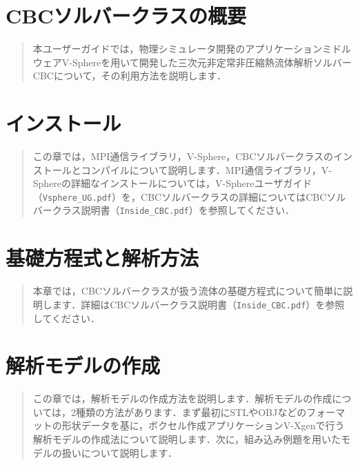 \documentclass[a4paper,10pt,oneside,fleqn]{jsbook}
\begin{document}
\chapter{CBCソルバークラスの概要}
\label{chpt:intro}
{\begin{abstract}
本ユーザーガイドでは，物理シミュレータ開発のアプリケーションミドルウェアV-Sphereを用いて開発した三次元非定常非圧縮熱流体解析ソルバーCBCについて，その利用方法を説明します．
\end{abstract}
%




\chapter{インストール}
\label{chpt:install}
\begin{abstract}
この章では，MPI通信ライブラリ，V-Sphere，CBCソルバークラスのインストールとコンパイルについて説明します．MPI通信ライブラリ，V-Sphereの詳細なインストールについては，V-Sphereユーザガイド（\verb|Vsphere_UG.pdf|）を，CBCソルバークラスの詳細についてはCBCソルバークラス説明書（\verb|Inside_CBC.pdf|）を参照してください．
\end{abstract}
%




\chapter{基礎方程式と解析方法}
\label{chpt:eqs}
\begin{abstract}
本章では，CBCソルバークラスが扱う流体の基礎方程式について簡単に説明します．詳細はCBCソルバークラス説明書（\verb|Inside_CBC.pdf|）を参照してください．
\end{abstract}
%




\chapter{解析モデルの作成}
\label{chpt:model}
\begin{abstract}
この章では，解析モデルの作成方法を説明します．解析モデルの作成については，2種類の方法があります．まず最初にSTLやOBJなどのフォーマットの形状データを基に，ボクセル作成アプリケーションV-Xgenで行う解析モデルの作成法について説明します．次に，組み込み例題を用いたモデルの扱いについて説明します．
\end{abstract}
%




}
\end{document}
